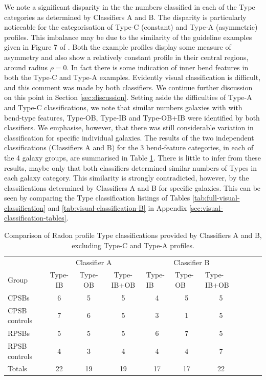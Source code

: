 We note a significant disparity in the the numbers classified in each of the Type categories as determined by Classifiers A and B. The disparity is particularly noticeable for the categorisation of Type-C (constant) and Type-A (asymmetric) profiles. This imbalance may be due to the similarity of the guideline examples given in Figure 7 of \cite{2018MNRAS.480.2217S}. Both the example profiles display some measure of asymmetry and also show a relatively constant profile in their central regions, around radius $\rho = 0$. In fact there is some indication of inner bend features in both the Type-C and Type-A examples. Evidently visual classification is difficult, and this comment was made by both classifiers. We continue further discussion on this point in Section \ref{sec:discussion}. Setting aside the difficulties of Type-A and Type-C classifications, we note that similar numbers galaxies with with bend-type features, Type-OB, Type-IB and Type-OB+IB were identified by both classifiers. We emphasise, however, that there was still considerable variation in classification for specific individual galaxies. The results of the two independent classifications (Classifiers A and B) for the 3 bend-feature categories, in each of the 4 galaxy groups, are summarised in Table \ref{tab:Radon-VC3-results}. There is little to infer from these results, maybe only that both classifiers determined similar numbers of Types in each galaxy category. This similarity is strongly contradicted, however, by the classifications determined by Classifiers A and B for specific galaxies. This can be seen by comparing the Type classification listings of Tables \ref{tab:full-visual-classification} and \ref{tab:visual-classification-B} in Appendix \ref{sec:visual-classification-tables}.

\begin{table}
\caption[Comparison of Radon profile classifications by classifiers A and B, excluding Types A and B]{Comparison of Radon profile Type classifications provided by Classifiers A and B, excluding Type-C and Type-A profiles.}
\label{tab:Radon-VC3-results}
\begin{tabular}{lccccccccc}
\hline
 & \multicolumn{3}{c}{Classifier A} & \multicolumn{3}{c}{Classifier B} \\ 
Group & Type-IB & Type-OB & Type-IB+OB & \multicolumn{1}{l}{Type-IB} & \multicolumn{1}{l}{Type-OB} & \multicolumn{1}{l}{Type-IB+OB} \\
\hline
CPSBs & 6 & 5 & 5 & 4 & 5 & 5 \\
CPSB controls & 7 & 6 & 5 & 3 & 1 & 5 \\
RPSBs & 5 & 5 & 5 & 6 & 7 & 5 \\
RPSB controls & 4 & 3 & 4 & 4 & 4 & 7 \\
\hline
Totals & 22 & 19 & 19 & 17 & 17 & 22 \\
\hline
\end{tabular}
\end{table}

